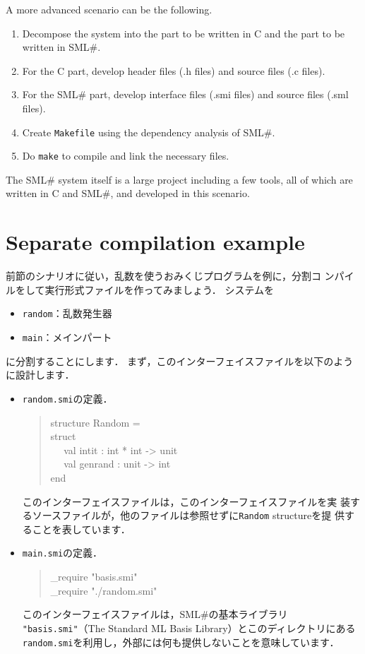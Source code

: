\documentclass{jbook}
\newcommand{\txt}[2]{#2}
\newcommand{\smlsharp}{SML\#}
\newcommand{\myem}{\mbox{\ \ }}
\newenvironment{program}{\begin{quote}\begin{tt}}%
                        {\end{tt}\end{quote}}
\begin{document}
	A more advanced scenario can be the following.
\begin{enumerate}
\item Decompose the system into the part to be written in C and the part
to be written in \smlsharp{}.
\item For the C part, develop header files (.h files) and source files
(.c files). 
\item For the \smlsharp{} part, develop interface files (.smi files)
and source files (.sml files).
\item Create {\tt Makefile} using the dependency analysis of \smlsharp{}.
\item Do {\tt make} to compile and link the necessary files.
\end{enumerate}
	The \smlsharp{} system itself is a large project including a few
tools, all of which are written in C and \smlsharp{}, and developed in
this scenario.
\fi%

\section{\txt{分割コンパイル例}{Separate compilation example}}
\label{sec:tutorialSeparateCompilationExample}

\ifjp%
	前節のシナリオに従い，乱数を使うおみくじプログラムを例に，分割コ
ンパイルをして実行形式ファイルを作ってみましょう．
	システムを
\begin{itemize}
\item {\tt random}：乱数発生器
\item {\tt main}：メインパート
\end{itemize}
に分割することにします．
	まず，このインターフェイスファイルを以下のように設計します．
\begin{itemize}
\item {\tt random.smi}の定義．
\begin{program}
structure Random =
\\
struct
\\\myem
  val intit : int * int -> unit
\\\myem
  val genrand : unit -> int
\\
end
\end{program}
	このインターフェイスファイルは，このインターフェイスファイルを実
装するソースファイルが，他のファイルは参照せずに{\tt Random} structureを提
供することを表しています．
\item {\tt main.smi}の定義．
\begin{program}
\_require "basis.smi"\\
\_require "./random.smi"
\end{program}
	このインターフェイスファイルは，\smlsharp{}の基本ライブラリ{\tt
"basis.smi"}（The Standard ML Basis Library）とこのディレクトリにある
{\tt random.smi}を利用し，外部には何も提供しないことを意味しています．
\end{itemize}
\end{document}
